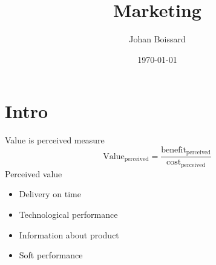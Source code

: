 \documentclass[a4paper,titlepage] {scrartcl}
\author{Johan Boissard}
\date{\today}
\title{Marketing}
\begin{document}
\maketitle
\tableofcontents
\newpage

\section{Intro}	

Value is perceived measure
\begin{equation}
	\text{Value}_{\text{perceived}} = \frac{\text{benefit}_{\text{perceived}}}{\text{cost}_{\text{perceived}}}
\end{equation} 
Perceived value
\begin{itemize}
	\item Delivery on time
	\item Technological performance
	\item Information about product
	\item Soft performance
\end{itemize}
\end{document}
